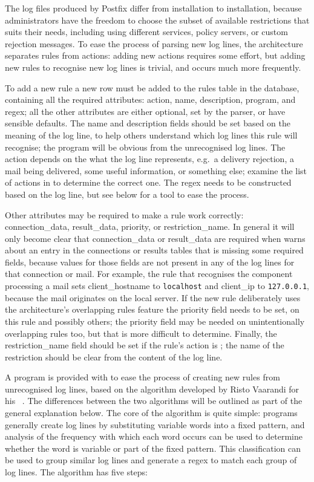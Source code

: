 The log files produced by Postfix differ from installation to installation,
because administrators have the freedom to choose the subset of available
restrictions that suits their needs, including using different
 services, policy servers, or custom rejection messages.  To
ease the process of parsing new log lines, the architecture separates rules
from actions: adding new actions requires some effort, but adding new rules
to recognise new log lines is trivial, and occurs much more frequently.

To add a new rule a new row must be added to the rules table in the
database, containing all the required attributes: action, name,
description, program, and regex; all the other attributes are either
optional, set by the parser, or have sensible defaults.  The name and
description fields should be set based on the meaning of the log line, to
help others understand which log lines this rule will recognise; the
program will be obvious from the unrecognised log lines.  The action
depends on the what the log line represents, e.g.\ a delivery rejection, a
mail being delivered, some useful information, or something else; examine
the list of actions in  to
determine the correct one.  The regex needs to be constructed based on the
log line, but see below for a tool to ease the process.

Other attributes may be required to make a rule work correctly:
connection\_data, result\_data, priority, or restriction\_name.  In general
it will only become clear that connection\_data or result\_data are
required when \parsername{} warns about an entry in the connections or
results tables that is missing some required fields, because values for
those fields are not present in any of the log lines for that connection or
mail.  For example, the rule that recognises the  component
processing a mail sets client\_hostname to \texttt{localhost} and
client\_ip to \texttt{127.0.0.1}, because the mail originates on the local
server.  If the new rule deliberately uses the architecture's overlapping
rules feature the priority field needs to be set, on this rule and possibly
others; the priority field may be needed on unintentionally overlapping
rules too, but that is more difficult to determine.  Finally, the
restriction\_name field should be set if the rule's action is
; the name of the restriction should be clear
from the content of the log line.

A program is provided with \parsername{} to ease the process of creating
new rules from unrecognised log lines, based on the algorithm developed by
Risto Vaarandi for his ~\cite{slct-paper}.  The differences
between the two algorithms will be outlined as part of the general
explanation below.  The core of the  algorithm is quite
simple: programs generally create log lines by substituting variable words
into a fixed pattern, and analysis of the frequency with which each word
occurs can be used to determine whether the word is variable or part of the
fixed pattern.  This classification can be used to group similar log lines
and generate a regex to match each group of log lines.  The algorithm has
five steps:

